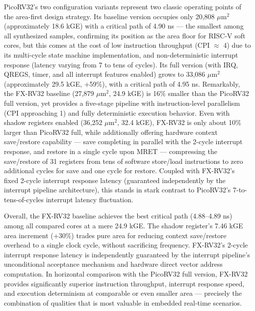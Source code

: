\documentclass[letterpaper,journal]{IEEEtran}
\begin{document}
PicoRV32's two configuration variants represent two classic operating points of the area-first design strategy.
Its baseline version occupies only 20,808 $\mu$m$^2$ (approximately 18.6 kGE) with a critical path of 4.90 ns — the smallest among all synthesized samples, confirming its position as the area floor for RISC-V soft cores, but this comes at the cost of low instruction throughput (CPI $\approx$ 4) due to its multi-cycle state machine implementation, and non-deterministic interrupt response (latency varying from 7 to tens of cycles).
Its full version (with IRQ, QREGS, timer, and all interrupt features enabled) grows to 33,086 $\mu$m$^2$ (approximately 29.5 kGE, +59\%), with a critical path of 4.95 ns.
Remarkably, the FX-RV32 baseline (27,879 $\mu$m$^2$, 24.9 kGE) is 16\% smaller than the PicoRV32 full version, yet provides a five-stage pipeline with instruction-level parallelism (CPI approaching 1) and fully deterministic execution behavior.
Even with shadow registers enabled (36,252 $\mu$m$^2$, 32.4 kGE), FX-RV32 is only about 10\% larger than PicoRV32 full, while additionally offering hardware context save/restore capability — save completing in parallel with the 2-cycle interrupt response, and restore in a single cycle upon MRET — compressing the save/restore of 31 registers from tens of software store/load instructions to zero additional cycles for save and one cycle for restore.
Coupled with FX-RV32's fixed 2-cycle interrupt response latency (guaranteed independently by the interrupt pipeline architecture), this stands in stark contrast to PicoRV32's 7-to-tens-of-cycles interrupt latency fluctuation.

Overall, the FX-RV32 baseline achieves the best critical path (4.88--4.89 ns) among all compared cores at a mere 24.9 kGE.
The shadow register's 7.46 kGE area increment (+30\%) trades pure area for reducing context save/restore overhead to a single clock cycle, without sacrificing frequency.
FX-RV32's 2-cycle interrupt response latency is independently guaranteed by the interrupt pipeline's unconditional acceptance mechanism and hardware direct vector address computation.
In horizontal comparison with the PicoRV32 full version, FX-RV32 provides significantly superior instruction throughput, interrupt response speed, and execution determinism at comparable or even smaller area — precisely the combination of qualities that is most valuable in embedded real-time scenarios.
\end{document}
